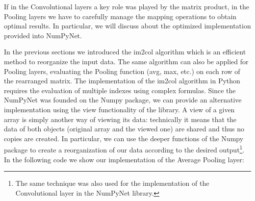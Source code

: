 \documentclass{standalone}
\begin{document}
If in the Convolutional layers a key role was played by the matrix product, in the Pooling layers we have to carefully manage the mapping operations to obtain optimal results.
In particular, we will discuss about the optimized implementation provided into \textsf{NumPyNet}.

In the previous sections we introduced the \textsf{im2col} algorithm which is an efficient method to reorganize the input data.
The same algorithm can also be applied for Pooling layers, evaluating the Pooling function (avg, max, etc.) on each row of the rearranged matrix.
The implementation of the \textsf{im2col} algorithm in \textsf{Python} requires the evaluation of multiple indexes using complex formulas.
Since the \textsf{NumPyNet} was founded on the \textsf{Numpy} package, we can provide an alternative implementation using the \textsf{view} functionality of the library.
A \textsf{view} of a given array is simply another way of viewing its data: technically it means that the data of both objects (original array and the viewed one) are shared and thus no copies are created.
In particular, we can use the deeper functions of the \textsf{Numpy} package to create a reorganization of our data according to the desired output\footnote{
  The same technique was also used for the implementation of the Convolutional layer in the \textsf{NumPyNet} library.
}.
In the following code we show our implementation of the Average Pooling layer:
\end{document}
